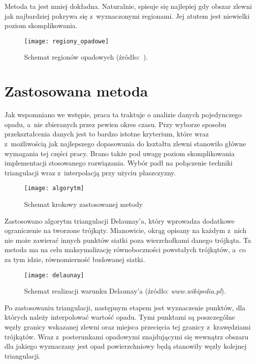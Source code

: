 Metoda ta jest mniej dokładna. Naturalnie, spisuje się najlepiej gdy obszar zlewni jak najbardziej pokrywa się z~wyznaczonymi regionami. Jej atutem jest niewielki poziom skomplikowania.

\begin{figure}[!ht]
\centering
\texttt{[image: regiony\_opadowe]}
\caption{Schemat regionów opadowych (źródło:~\cite{metody_obliczania_pb}).}
\label{fig:regiony_opadowe}
\end{figure}


\section{Zastosowana metoda}
\label{sec:zastosowana_metoda}
Jak wspomniano we wstępie, praca ta traktuje o analizie danych pojedynczego opadu, a~nie zbieranych przez pewien okres czasu. Przy wyborze sposobu przekształcenia danych jest to bardzo istotne kryterium, które wraz z~możliwością jak najlepszego dopasowania do kształtu zlewni stanowiło główne wymagania tej części pracy. Brano także pod uwagę poziom skomplikowania implementacji stosowanego rozwiązania. Wybór padł na połączenie techniki triangulacji wraz z~interpolacją przy użyciu płaszczyzny.

\begin{figure}[!ht]
	\centering
	\texttt{[image: algorytm]}
	\caption{Schemat krokowy zastosowanej metody}
	\label{fig:algorytm}
\end{figure}

Zastosowano algorytm triangulacji Delaunay'a, który wprowadza dodatkowe ograniczenie na tworzone trójkąty. Mianowicie, okrąg opisany na każdym z~nich nie może zawierać innych punktów siatki poza wierzchołkami danego trójkąta. Ta metoda ma na celu maksymalizację równoboczności powstałych trójkątów, a~co za tym idzie, równomierność budowanej siatki.

\begin{figure}[!ht]
	\centering
	\texttt{[image: delaunay]}
	\caption{Schemat realizacji warunku Delaunay'a (źródło: \textit{www.wikipedia.pl}).}
	\label{fig:delaunay}
\end{figure}

Po zastosowaniu triangulacji, następnym etapem jest wyznaczenie punktów, dla których należy interpolować wartość opadu. Tymi punktami są poszczególne węzły granicy wskazanej zlewni oraz miejsca przecięcia tej granicy z~krawędziami trójkątów. Wraz z~posterunkami opadowymi znajdującymi się wewnątrz obszaru dla jakiego wyznaczany jest opad powierzchniowy będą stanowiły węzły kolejnej triangulacji.

